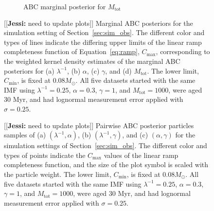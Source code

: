 \documentclass[12pt]{article}
\newcommand{\jessi}[1]{{\color{blue}[[\textbf{Jessi: }#1]]}}
\newcommand{\Msun}{M_{\odot}}
\newcommand{\Cmin}{C_{\text{min}}}
\newcommand{\Cmax}{C_{\text{max}}}
\newcommand{\Mtot}{M_{\text{tot}}}
\begin{document}
\begin{figure}[htbp]
\begin{subfigure}{0.48\textwidth}
\caption{ABC marginal posterior for  $\Mtot$}\label{subfig:marg_mtot_obs}
\end{subfigure}
%
 \caption{\jessi{need to update plots} Marginal ABC posteriors for the simulation setting of Section~\ref{sec:sim_obs}.  The different color and types of lines indicate the differing upper limits of the linear ramp completeness function of Equation~\eqref{eq:ramp}, $\Cmax$, corresponding to the weighted kernel density estimates of the marginal ABC posteriors for (a) $\lambda^{-1}$, (b) $\alpha$, (c) $\gamma$, and (d) $\Mtot$.  
The lower limit, $\Cmin$, is fixed at 0.08$\Msun$.  
All five datasets started with the same IMF using $\lambda^{-1} = 0.25$, $\alpha = 0.3$, $\gamma = 1$, and $\Mtot = 1000$, were aged 30 Myr, and had lognormal measurement error applied with $\sigma = 0.25$.
   }
   \label{fig:abc_pa_posterior_obs}
\end{figure}



\begin{figure}[htbp]
   \centering
\caption{\jessi{need to update plots} Pairwise ABC posterior particles samples of (a) $(\lambda^{-1}, \alpha)$, (b) $(\lambda^{-1}, \gamma)$, and (c) $(\alpha, \gamma)$ for the simulation settings of Section~\ref{sec:sim_obs}.  The different color and types of points indicate the $\Cmax$ values of the linear ramp completeness function, and the size of the plot symbol is scaled with the particle weight.  
The lower limit, $\Cmin$, is fixed at 0.08$\Msun$.  
All five datasets started with the same IMF using $\lambda^{-1} = 0.25$, $\alpha = 0.3$, $\gamma = 1$, and $\Mtot = 1000$, were aged 30 Myr, and had lognormal measurement error applied with $\sigma = 0.25$.
}
\label{fig:abc_pa_joints_obs}
\end{figure}
\end{document}
